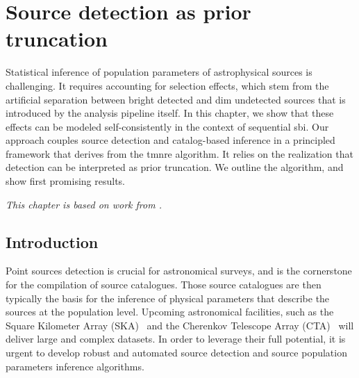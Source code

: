\chapter{Source detection as prior truncation} \label{cha:detection}


Statistical inference of population parameters of astrophysical sources is challenging. It requires accounting for selection effects, which stem from the artificial separation between bright detected and dim undetected sources that is introduced by the analysis pipeline itself. In this chapter, we show that these effects can be modeled self-consistently in the context of sequential \gls*{sbi}. Our approach couples source detection and catalog-based inference in a principled framework that derives from the \gls*{tmnre} algorithm. It relies on the realization that detection can be interpreted as prior truncation. We outline the algorithm, and show first promising results.

\textit{This chapter is based on work from \cite{AnauMontel:2022ppb}.}


\section{Introduction}
\label{sec:ps-intro}

Point sources detection is crucial for astronomical surveys, and is the cornerstone for the compilation of source catalogues. Those source catalogues are then typically the basis for the inference of physical parameters that describe the sources at the population level. Upcoming astronomical facilities, such as the Square Kilometer Array (SKA)~\citep{Weltman:2018zrl} and the Cherenkov Telescope Array (CTA)~\citep{CTAConsortium:2017dvg} will deliver large and complex datasets.  In order to leverage their full potential, it is urgent to develop robust and automated source detection and source population parameters inference algorithms.

